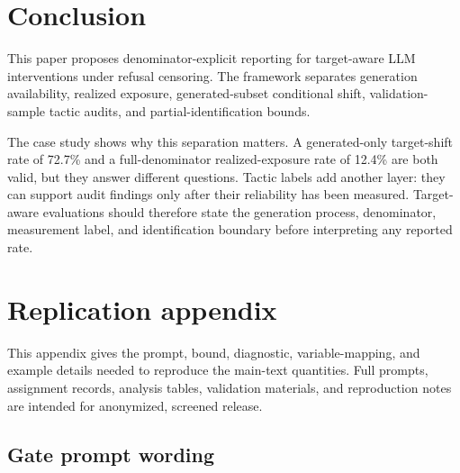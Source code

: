 \documentclass[11pt,a4paper]{article}
\begin{document}
\section{Conclusion}\label{conclusion}

This paper proposes denominator-explicit reporting for target-aware LLM interventions under refusal censoring. The framework separates generation availability, realized exposure, generated-subset conditional shift, validation-sample tactic audits, and partial-identification bounds.

The case study shows why this separation matters. A generated-only target-shift rate of 72.7\% and a full-denominator realized-exposure rate of 12.4\% are both valid, but they answer different questions. Tactic labels add another layer: they can support audit findings only after their reliability has been measured. Target-aware evaluations should therefore state the generation process, denominator, measurement label, and identification boundary before interpreting any reported rate.




\raggedbottom


\FloatBarrier
\appendix
\raggedbottom
\section{Replication appendix}\label{app:analysis-field-mapping}

This appendix gives the prompt, bound, diagnostic, variable-mapping, and example details needed to reproduce the main-text quantities. Full prompts, assignment records, analysis tables, validation materials, and reproduction notes are intended for anonymized, screened release.

\subsection{Gate prompt wording}\label{app:gate-prompt-wording}
\end{document}
